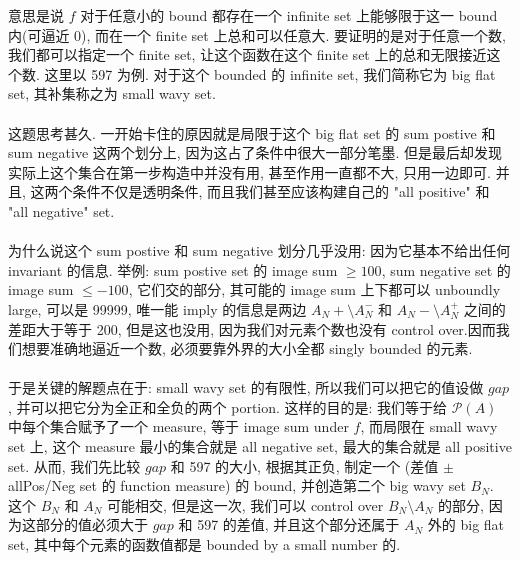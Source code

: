 \documentclass[lang=cn,11pt]{elegantbook}
\begin{document}
\begin{remark}
    意思是说 $f$ 对于任意小的 bound 都存在一个 infinite set 上能够限于这一 bound 内(可逼近 0), 而在一个 finite set 上总和可以任意大. 要证明的是对于任意一个数, 我们都可以指定一个 finite set, 让这个函数在这个 finite set 上的总和无限接近这个数. 这里以 597 为例. 对于这个 bounded 的 infinite set, 我们简称它为 big flat set, 其补集称之为 small wavy set.\\\\
    这题思考甚久. 一开始卡住的原因就是局限于这个 big flat set 的 sum postive 和 sum negative 这两个划分上, 因为这占了条件中很大一部分笔墨. 但是最后却发现实际上这个集合在第一步构造中并没有用, 甚至作用一直都不大, 只用一边即可. 并且, 这两个条件不仅是透明条件, 而且我们甚至应该构建自己的 "all positive" 和 "all negative" set.\\\\
    为什么说这个 sum postive 和 sum negative 划分几乎没用: 因为它基本不给出任何 invariant 的信息. 举例: sum postive set 的 image sum $\geq 100$, sum negative set 的 image sum $\leq -100$, 它们交的部分, 其可能的 image sum 上下都可以 unboundly large, 可以是 99999, 唯一能 imply 的信息是两边 $A_N+ \setminus A_N^-$ 和 $A_N- \setminus A_N^+$ 之间的差距大于等于 200, 但是这也没用, 因为我们对元素个数也没有 control over.因而我们想要准确地逼近一个数, 必须要靠外界的大小全都 singly bounded 的元素.\\\\
    于是关键的解题点在于: small wavy set 的有限性, 所以我们可以把它的值设做 $gap$, 并可以把它分为全正和全负的两个 portion. 这样的目的是: 我们等于给 $\mathcal{P}(A)$ 中每个集合赋予了一个 measure, 等于 image sum under $f$, 而局限在 small wavy set 上, 这个 measure 最小的集合就是 all negative set, 最大的集合就是 all positive set. 从而, 我们先比较 $gap$ 和 597 的大小, 根据其正负, 制定一个 (差值 $\pm$ allPos/Neg set 的 function measure) 的 bound, 并创造第二个 big wavy set $B_N$. 这个 $B_N$ 和 $A_N$ 可能相交, 但是这一次, 我们可以 control over $B_N \setminus A_N$ 的部分, 因为这部分的值必须大于 $gap$ 和 597 的差值, 并且这个部分还属于 $A_N$ 外的 big flat set, 其中每个元素的函数值都是 bounded by a small number 的. 
\end{remark}
\end{document}
